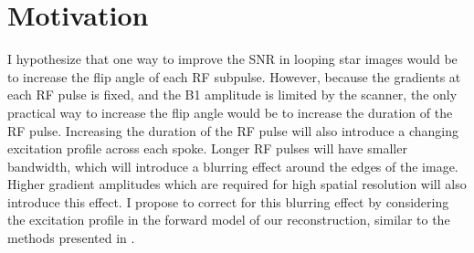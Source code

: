 \documentclass[11pt]{article}
\begin{document}
\section*{Motivation}
I hypothesize that one way to improve the SNR in looping star images would be to increase the flip angle of each RF subpulse.
However, because the gradients at each RF pulse is fixed, and the B1 amplitude is limited by the scanner,
the only practical way to increase the flip angle would be to increase the duration of the RF pulse.
Increasing the duration of the RF pulse will also introduce a changing excitation profile across each spoke.
Longer RF pulses will have smaller bandwidth, which will introduce a blurring effect around the edges of the image.
Higher gradient amplitudes which are required for high spatial resolution will also introduce this effect.
I propose to correct for this blurring effect by considering the excitation profile in the forward model of our reconstruction,
similar to the methods presented in \cite{Li2014}.
\end{document}
